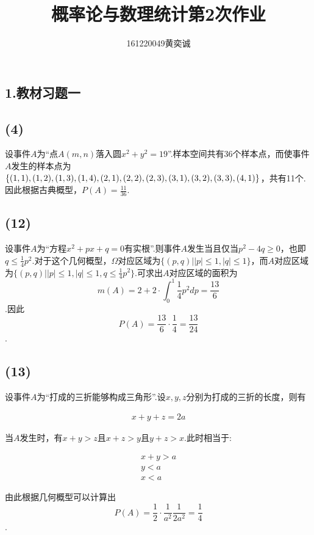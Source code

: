 \documentclass[twocolumn]{article}
\begin{document}
	\begin{CJK}{UTF8}{gbsn}		
			\title{概率论与数理统计第2次作业}
			\author{161220049\quad 黄奕诚}
			\maketitle
			
			\section*{1.教材习题一}
			\subsection*{(4)}
				设事件$A$为``点$A(m,n)$落入圆$x^2+y^2=19$''.样本空间共有36个样本点，而使事件$A$发生的样本点为$\{(1,1),(1,2),(1,3),(1,4),(2,1),(2,2),(2,3),(3,1),\\(3,2),(3,3),(4,1)\}$，共有11个.因此根据古典概型，$P(A)=\frac{11}{36}$.
			\subsection*{(12)}
				设事件$A$为``方程$x^2+px+q=0$有实根''.则事件$A$发生当且仅当$p^2-4q\ge0$，也即$q\le\frac{1}{4}p^2$.对于这个几何概型，$\Omega$对应区域为$\{(p,q)||p|\le1,|q|\le1\}$，而$A$对应区域为$\{(p,q)||p|\le1,|q|\le1,q\le\frac{1}{4}p^2\}$.可求出$A$对应区域的面积为\[m(A)=2+2\cdot\int_{0}^{1}\frac{1}{4}p^2dp=\frac{13}{6}\].因此\[P(A) = \frac{13}{6}\cdot\frac{1}{4}=\frac{13}{24}\].
			\subsection*{(13)}
				设事件$A$为``打成的三折能够构成三角形''.设$x,y,z$分别为打成的三折的长度，则有
				\begin{center}
				\begin{align*}
					x+y+z = 2a
				\end{align*}
				\end{center}
				当$A$发生时，有$x+y>z$且$x+z>y$且$y+z>x$.此时相当于:
				\begin{center}
				\begin{align*}
					x+y>a\\
					y<a\\
					x<a
				\end{align*}
				\end{center}
				由此根据几何概型可以计算出\[P(A)=\frac{1}{2}\cdot\frac{1}{a^2}\frac{1}{2a^2}=\frac{1}{4}\].

\end{CJK}
\end{document}
